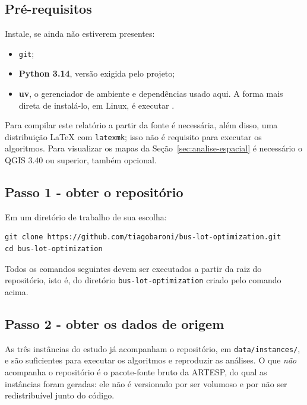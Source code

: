 \documentclass[12pt,a4paper]{article}
\begin{document}
\subsection{Pré-requisitos}

Instale, se ainda não estiverem presentes:

\begin{itemize}
  \item \texttt{git};
  \item \textbf{Python 3.14}, versão exigida pelo projeto;
  \item \textbf{uv}, o gerenciador de ambiente e dependências usado aqui.
    A forma mais direta de instalá-lo, em Linux, é executar
    \small{}.
\end{itemize}

Para compilar este relatório a partir da fonte é necessária, além disso,
uma distribuição \LaTeX{} com \texttt{latexmk}; isso não é requisito para
executar os algoritmos. Para visualizar os mapas da
Seção~\ref{sec:analise-espacial} é necessário o QGIS 3.40 ou superior,
também opcional.

\subsection{Passo 1 - obter o repositório}

Em um diretório de trabalho de sua escolha:

\begin{verbatim}
git clone https://github.com/tiagobaroni/bus-lot-optimization.git
cd bus-lot-optimization
\end{verbatim}

Todos os comandos seguintes devem ser executados a partir da raiz do
repositório, isto é, do diretório \texttt{bus-lot-optimization} criado
pelo comando acima.

\subsection{Passo 2 - obter os dados de origem}

As três instâncias do estudo já acompanham o repositório, em
\texttt{data/instances/}, e são suficientes para executar os algoritmos e
reproduzir as análises. O que \emph{não} acompanha o repositório é o
pacote-fonte bruto da ARTESP, do qual as instâncias foram geradas: ele
não é versionado por ser volumoso e por não ser redistribuível junto do
código.
\end{document}

